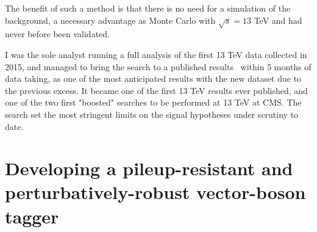 \documentclass{pasa}%
\begin{document}
The benefit of such a method is that there is no need for a simulation of the background, a necessary advantage as Monte Carlo with $\sqrt{s}=13$ TeV and had never before been validated.

I was the sole analyst running a full analysis of the first 13 TeV data collected in 2015, and managed to bring the search to a published results~\cite{Sirunyan2017} within 5 months of data taking, as one of the most anticipated results with the new dataset due to the previous excess. It became one of the first 13 TeV results ever published, and one of the two first "boosted" searches to be performed at 13 TeV at CMS. The search set the most stringent limits on the signal hypotheses under scrutiny to date.

\section{Developing a pileup-resistant and perturbatively-robust vector-boson tagger}
\label{sec:yearII}
\end{document}
